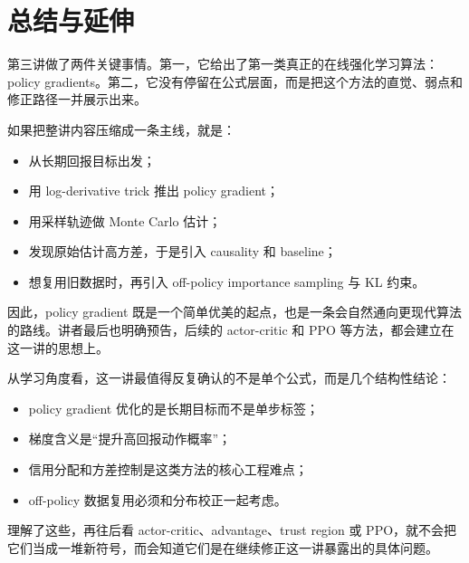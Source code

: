 \documentclass[a4paper]{article}
\begin{document}
\section{总结与延伸}

第三讲做了两件关键事情。第一，它给出了第一类真正的在线强化学习算法：policy gradients。第二，它没有停留在公式层面，而是把这个方法的直觉、弱点和修正路径一并展示出来。

如果把整讲内容压缩成一条主线，就是：
\begin{itemize}
\item 从长期回报目标出发；
\item 用 log-derivative trick 推出 policy gradient；
\item 用采样轨迹做 Monte Carlo 估计；
\item 发现原始估计高方差，于是引入 causality 和 baseline；
\item 想复用旧数据时，再引入 off-policy importance sampling 与 KL 约束。
\end{itemize}

因此，policy gradient 既是一个简单优美的起点，也是一条会自然通向更现代算法的路线。讲者最后也明确预告，后续的 actor-critic 和 PPO 等方法，都会建立在这一讲的思想上。

从学习角度看，这一讲最值得反复确认的不是单个公式，而是几个结构性结论：
\begin{itemize}
\item policy gradient 优化的是长期目标而不是单步标签；
\item 梯度含义是“提升高回报动作概率”；
\item 信用分配和方差控制是这类方法的核心工程难点；
\item off-policy 数据复用必须和分布校正一起考虑。
\end{itemize}

理解了这些，再往后看 actor-critic、advantage、trust region 或 PPO，就不会把它们当成一堆新符号，而会知道它们是在继续修正这一讲暴露出的具体问题。
\end{document}
